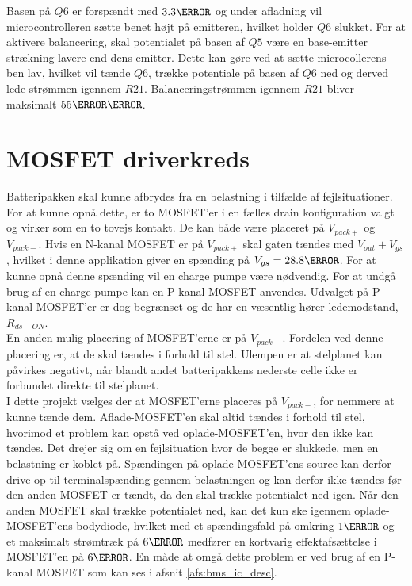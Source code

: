 Basen på $Q6$ er forspændt med $3.3\volt$ og under afladning vil microcontrolleren sætte benet højt på emitteren, hvilket holder $Q6$ slukket. For at aktivere balancering, skal potentialet på basen af $Q5$ være en base-emitter strækning lavere end dens emitter. Dette kan gøre ved at sætte microcollerens ben lav, hvilket vil tænde $Q6$, trække potentiale på basen af $Q6$ ned og derved lede strømmen igennem $R21$. Balanceringstrømmen igennem $R21$ bliver maksimalt $55\milli\ampere$.

\section{MOSFET driverkreds}
Batteripakken skal kunne afbrydes fra en belastning i tilfælde af fejlsituationer. For at kunne opnå dette, er to MOSFET'er i en fælles drain konfiguration valgt og virker som en to tovejs kontakt. De kan både være placeret på $V_{pack+}$ og $V_{pack-}$. Hvis en N-kanal MOSFET er på $V_{pack+}$ skal gaten tændes med $V_{out} + V_{gs}$, hvilket i denne applikation giver en spænding på $V_{gs} = 28.8\volt$. For at kunne opnå denne spænding vil en charge pumpe være nødvendig. For at undgå brug af en charge pumpe kan en P-kanal MOSFET anvendes. Udvalget på P-kanal MOSFET'er er dog begrænset og de har en væsentlig hører ledemodstand, $R_{ds-ON}$. 
\\

En anden mulig placering af MOSFET'erne er på $V_{pack-}$. Fordelen ved denne placering er, at de skal tændes i forhold til stel. Ulempen er at stelplanet kan påvirkes negativt, når blandt andet batteripakkens nederste celle ikke er forbundet direkte til stelplanet.
\\

I dette projekt vælges der at MOSFET'erne placeres på $V_{pack-}$, for nemmere at kunne tænde dem. Aflade-MOSFET'en skal altid tændes i forhold til stel, hvorimod et problem kan opstå ved oplade-MOSFET'en, hvor den ikke kan tændes. Det drejer sig om en fejlsituation hvor de begge er slukkede, men en belastning er koblet på. Spændingen på oplade-MOSFET'ens source kan derfor drive op til terminalspænding gennem belastningen og kan derfor ikke tændes før den anden MOSFET er tændt, da den skal trække potentialet ned igen. Når den anden MOSFET skal trække potentialet ned, kan det kun ske igennem oplade-MOSFET'ens bodydiode, hvilket med et spændingsfald på omkring $1\volt$ og et maksimalt strømtræk på $6\ampere$ medfører en kortvarig effektafsættelse i MOSFET'en på $6\watt$. En måde at omgå dette problem er ved brug af en P-kanal MOSFET som kan ses i afsnit \ref{afs:bms_ic_desc}.


